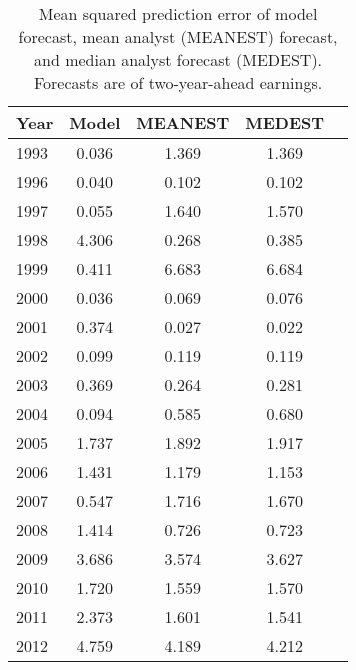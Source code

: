 \begin{table}[H]
\centering
\begin{tabular}{lcccc}
  \hline
Year & Model & MEANEST & MEDEST \\ 
  \hline
1993 & 0.036 & 1.369 & 1.369 \\ 
1996 & 0.040 & 0.102 & 0.102 \\ 
1997 & 0.055 & 1.640 & 1.570 \\ 
1998 & 4.306 & 0.268 & 0.385 \\ 
1999 & 0.411 & 6.683 & 6.684 \\ 
2000 & 0.036 & 0.069 & 0.076 \\ 
2001 & 0.374 & 0.027 & 0.022 \\ 
2002 & 0.099 & 0.119 & 0.119 \\ 
2003 & 0.369 & 0.264 & 0.281 \\ 
2004 & 0.094 & 0.585 & 0.680 \\ 
2005 & 1.737 & 1.892 & 1.917 \\ 
2006 & 1.431 & 1.179 & 1.153 \\ 
2007 & 0.547 & 1.716 & 1.670 \\ 
2008 & 1.414 & 0.726 & 0.723 \\ 
2009 & 3.686 & 3.574 & 3.627 \\ 
2010 & 1.720 & 1.559 & 1.570 \\ 
2011 & 2.373 & 1.601 & 1.541 \\ 
2012 & 4.759 & 4.189 & 4.212 \\ 
   \hline
\end{tabular}
\captionsetup{width=5.5in, font=footnotesize}
\caption{Mean squared prediction error of model forecast, mean analyst (MEANEST) forecast, and 
median analyst forecast (MEDEST). Forecasts are of two-year-ahead earnings.} 
\label{spe-by-year-table-fy2}
\end{table}
